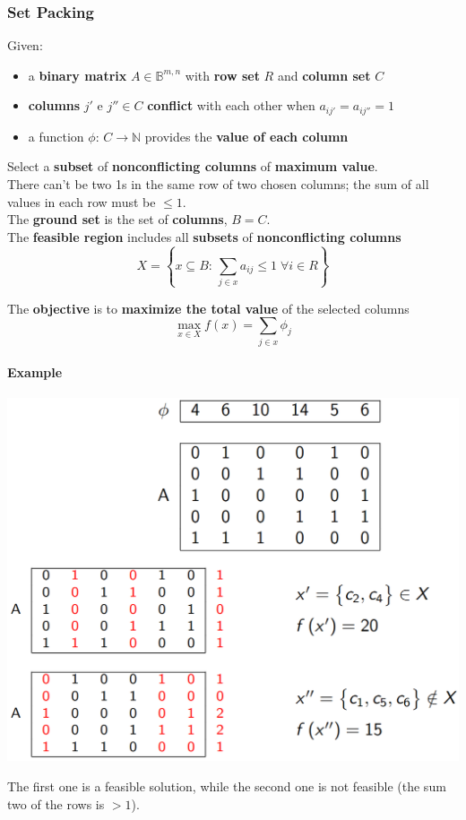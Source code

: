 \subsubsection{Set Packing}
Given:
\begin{itemize}
	\item a \textbf{binary matrix} $A \in \mathbb{B}^{m,n}$ with \textbf{row set} $R$ and \textbf{column set} $C$
	\item \textbf{columns} $j'$ e $j'' \in C$ \textbf{conflict} with each other when $a_{ij'} = a_{ij''} = 1$
	\item a function $\phi : \, C \rightarrow \mathbb{N}$ provides the \textbf{value of each column}
\end{itemize}
Select a \textbf{subset} of \textbf{nonconflicting columns} of \textbf{maximum value}.\\
There can't be two 1s in the same row of two chosen columns; the sum of all values in each row must be $\leq 1$.\\

The \textbf{ground set} is the set of \textbf{columns}, $B = C$.\\

The \textbf{feasible region} includes all \textbf{subsets} of \textbf{nonconflicting columns}
$$ X = \left\{x \subseteq B: \, \sum_{j \in x} a_{ij} \leq 1 \; \forall i \in R \right\}$$

The \textbf{objective} is to \textbf{maximize the total value} of the selected columns
$$ \max_{x \in X} f(x) = \sum_{j \in x} \phi_j $$

\newpage

\paragraph{Example}
\begin{center}
	\includegraphics[width=\columnwidth]{img/SetPacking1}
\end{center}
The first one is a feasible solution, while the second one is not feasible (the sum two of the rows is $>1$).\\

